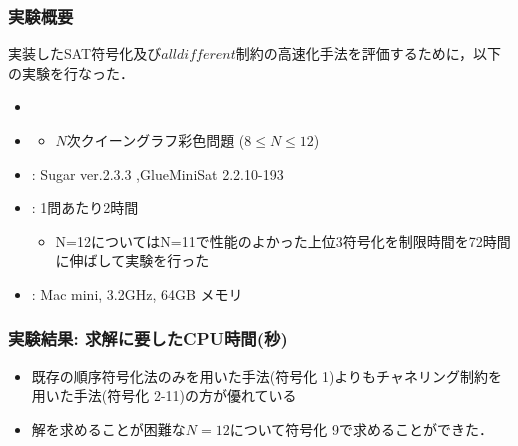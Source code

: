 \documentclass [dvipdfmx,11pt]{beamer}
\newcommand{\alldifferent}{$alldifferent$}
\begin{document}
\begin{frame}
    \frametitle{実験概要}
    実装したSAT符号化及び{\alldifferent}制約の高速化手法を評価するために，以下の実験を行なった．
    \begin{itemize}
        \item {}
        \item {}
            \begin{itemize}
                \item $N$次クイーングラフ彩色問題 ($8\leq N\leq 12$)
            \end{itemize}
        \item {}: Sugar ver.2.3.3 ,GlueMiniSat 2.2.10-193
        \item {}: 1問あたり2時間\\
            \begin{itemize}
                \item N=12についてはN=11で性能のよかった上位3符号化を制限時間を72時間に伸ばして実験を行った
            \end{itemize}
        \item {}: Mac mini, 3.2GHz, 64GB メモリ
    \end{itemize}
\end{frame}



\begin{frame}
    \frametitle{実験結果: 求解に要したCPU時間(秒)}
    \begin{block}{}\centering
        {\tiny }
    \end{block}
    \begin{itemize}
        \item 既存の順序符号化法のみを用いた手法(符号化 1)よりもチャネリング制約を用いた手法(符号化 2-11)の方が優れている
        \item 解を求めることが困難な$N=12$について符号化 9で求めることができた．
    \end{itemize}
\end{frame}
\end{document}
